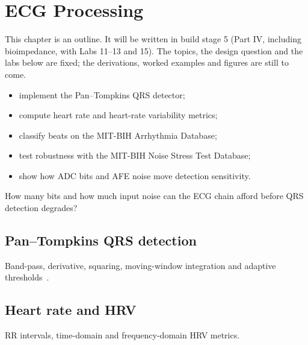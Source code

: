 \chapter{ECG Processing}\label{ch:ecg}

\begin{specnote}
This chapter is an outline. It will be written in build stage 5 (Part IV, including bioimpedance, with Labs 11--13 and 15). The topics, the design question and the labs below are fixed; the derivations, worked examples and figures are still to come.
\end{specnote}

\begin{objectives}
\begin{itemize}
  \item implement the Pan--Tompkins QRS detector;
  \item compute heart rate and heart-rate variability metrics;
  \item classify beats on the MIT-BIH Arrhythmia Database;
  \item test robustness with the MIT-BIH Noise Stress Test Database;
  \item show how ADC bits and AFE noise move detection sensitivity.
\end{itemize}
\end{objectives}

\begin{insight}
How many bits and how much input noise can the ECG chain afford before QRS detection degrades?
\end{insight}

\section{Pan--Tompkins QRS detection}\label{sec:ch24-1}
Band-pass, derivative, squaring, moving-window integration and adaptive thresholds~\cite{pantompkins1985}.

\section{Heart rate and HRV}\label{sec:ch24-2}
RR intervals, time-domain and frequency-domain HRV metrics.

